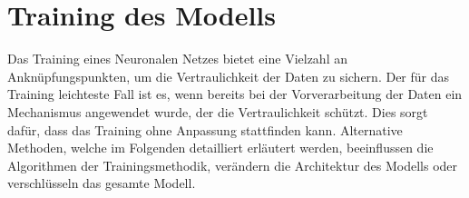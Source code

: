\section{Training des Modells}\label{sec:training_modells}

Das Training eines Neuronalen Netzes bietet eine Vielzahl an Anknüpfungspunkten, um die Vertraulichkeit der Daten zu sichern.
Der für das Training leichteste Fall ist es, wenn bereits bei der Vorverarbeitung der Daten ein Mechanismus angewendet wurde, der die Vertraulichkeit schützt.
Dies sorgt dafür, dass das Training ohne Anpassung stattfinden kann.
Alternative Methoden, welche im Folgenden detailliert erläutert werden, beeinflussen die Algorithmen der Trainingsmethodik, verändern die Architektur des Modells oder verschlüsseln das gesamte Modell.







